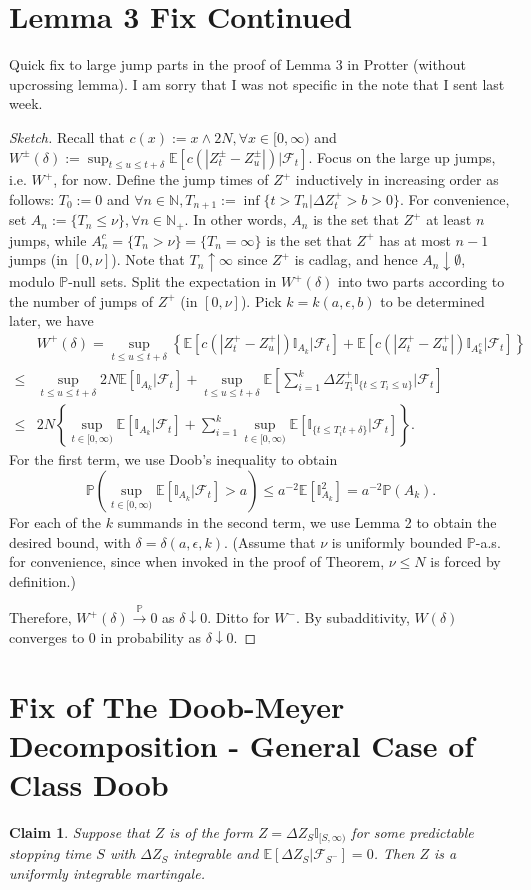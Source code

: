 \documentclass{article}
\newtheorem{claim}{Claim}
\newcommand{\E}{\mathbb{E}} %
\renewcommand{\P}{\mathbb{P}} %
\newcommand{\I}{\mathbb{I}} %
\newcommand{\F}{\mathcal{F}} %
\begin{document}
\section{Lemma 3 Fix Continued}
Quick fix to large jump parts in the proof of Lemma 3 in Protter (without upcrossing lemma). I am sorry that I was not specific in the note that I sent last week.

\begin{proof}[Sketch]
Recall that $c(x):=x\wedge 2N, \forall x\in[0,\infty)$ and $W^\pm(\delta):=\sup_{t\le u\le t+\delta} \E\left[c(|Z^\pm_t - Z^\pm_u|) \big| \F_t\right]$. Focus on the large up jumps, i.e. $W^+$, for now. Define the jump times of $Z^+$ inductively in increasing order as follows: $T_0:=0$ and ${ \forall n\in\mathbb{N}, T_{n+1}:=\inf\{t>T_n \big| \Delta Z^+_t > b > 0\} }$. For convenience, set $A_n:=\{T_n\le \nu\}, \forall n\in\mathbb{N}_+$. In other words, $A_n$ is the set that $Z^+$ at least $n$ jumps, while $A^c_n=\{T_n > \nu\}=\{T_n=\infty\}$ is the set that $Z^+$ has at most $n-1$ jumps (in $[0,\nu]$). Note that $T_n \uparrow \infty$ since $Z^+$ is cadlag, and hence $A_n \downarrow \emptyset$, modulo $\P$-null sets. Split the expectation in $W^+(\delta)$ into two parts according to the number of jumps of $Z^+$ (in $[0,\nu]$). Pick $k=k(a,\epsilon,b)$ to be determined later, we have
\begin{align*}
	& W^+(\delta) = \sup_{t\le u\le t+\delta} \left\{\E[c(|Z^+_t - Z^+_u|) \I_{A_k} \big| \F_t] + \E[c(|Z^+_t - Z^+_u|) \I_{A^c_k} \big| \F_t] \right\} \\
    \le & \sup_{t\le u\le t+\delta} 2N\E[\I_{A_k} \big| \F_t] + \sup_{t\le u\le t+\delta} \E\left[\sum_{i=1}^{k} \Delta Z^+_{T_i}\I_{\{t\le T_i \le u\}} \big| \F_t\right] \\
    \le & 2N \left\{ \sup_{t\in[0,\infty)} \E[\I_{A_k} \big| \F_t] + \sum_{i=1}^k \sup_{t\in[0,\infty)} \E[\I_{\{t\le T_i t+\delta\}} \big| \F_t] \right\}.
\end{align*}
For the first term, we use Doob's inequality to obtain
\[\P\left(\sup_{t\in[0,\infty)} \E[\I_{A_k} \big| \F_t] > a\right) \le a^{-2}\E[\I^2_{A_k}] = a^{-2}\P(A_k). \]
For each of the $k$ summands in the second term, we use Lemma 2 to obtain the desired bound, with $\delta=\delta(a,\epsilon,k)$. (Assume that $\nu$ is uniformly bounded $\P$-a.s. for convenience, since when invoked in the proof of Theorem, $\nu \le N$ is forced by definition.)

\par
Therefore, $W^+(\delta) \xrightarrow{\P} 0$ as $\delta \downarrow 0$. Ditto for $W^-$. By subadditivity, $W(\delta)$ converges to $0$ in probability as $\delta \downarrow 0$.
\end{proof}

\section{Fix of The Doob-Meyer Decomposition - General Case of Class Doob}
\begin{claim}
Suppose that $Z$ is of the form $Z=\Delta Z_{S}\I_{[S,\infty)}$ for some predictable stopping time $S$ with $\Delta Z_S$ integrable and $\E[\Delta Z_S \big| \F_{S^-}]=0$. Then $Z$ is a uniformly integrable martingale. 
\end{claim}
\end{document}
